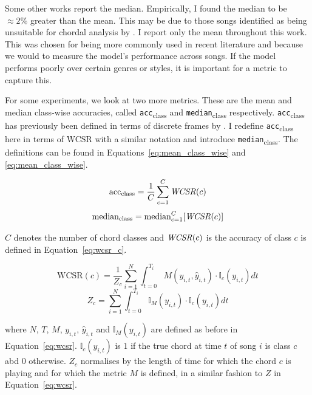 Some other works report the median. Empirically, I found the median to be $\approx 2\%$ greater than the mean. This may be due to those songs identified as being unsuitable for chordal analysis by \citet{FourTimelyInsights}. I report only the mean throughout this work. This was chosen for being more commonly used in recent literature and because we would to measure the model's performance across songs. If the model performs poorly over certain genres or styles, it is important for a metric to capture this.

For some experiments, we look at two more metrics. These are the mean and median class-wise accuracies, called \texttt{acc}\textsubscript{class} and \texttt{median}\textsubscript{class} respectively. \texttt{acc}\textsubscript{class} has previously been defined in terms of discrete frames by \citet{ACRLargeVocab1}. I redefine \texttt{acc}\textsubscript{class} here in terms of WCSR with a similar notation and introduce \texttt{median}\textsubscript{class}. The definitions can be found in Equations~\ref{eq:mean_class_wise} and \ref{eq:mean_class_wise}.

\begin{equation}\label{eq:mean_class_wise}
    \text{acc}\textsubscript{class} = \frac{1}{C} \sum_{c=1}^{C} \text{\emph{WCSR}}(c)
\end{equation}
\begin{equation}\label{eq:median_class_wise}
    \text{median}\textsubscript{class} = \text{median}_{c=1}^{C} [\text{\emph{WCSR}}(c)]
\end{equation}

$C$ denotes the number of chord classes and $\text{\emph{WCSR}}(c)$ is the accuracy of class $c$ is defined in Equation~\ref{eq:wcsr_c}.

\begin{equation}\label{eq:wcsr_c}
    \text{WCSR}(c) = \frac{1}{Z_c}\sum_{i=1}^{N} \int_{t=0}^{T_i} M(y_{i,t},\hat{y}_{i,t}) \cdot \mathbb{I}_c(y_{i,t}) dt
\end{equation}
\begin{equation}
    Z_c = \sum_{i=1}^{N} \int_{t=0}^{T_i} \mathbb{I}_M(y_{i,t})\cdot \mathbb{I}_c(y_{i,t}) dt
\end{equation}

where $N$, $T$, $M$, $y_{i,t}$, $\hat{y}_{i,t}$ and $\mathbb{I}_M(y_{i,t})$ are defined as before in Equation~\ref{eq:wcsr}. $\mathbb{I}_c(y_{i,t})$ is $1$ if the true chord at time $t$ of song $i$ is class $c$ abd $0$ otherwise. $Z_c$ normalises by the length of time for which the chord $c$ is playing and for which the metric $M$ is defined, in a similar fashion to $Z$ in Equation~\ref{eq:wcsr}.

